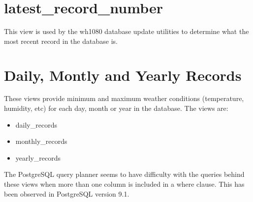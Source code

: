 \documentclass[a4paper,10pt]{book}
\begin{document}
\section{latest\_record\_number}
This view is used by the wh1080 database update utilities to determine what the most recent record in the database is.

\section{Daily, Montly and Yearly Records}
These views provide minimum and maximum weather conditions (temperature, humidity, etc) for each day, month or year in the database. The views are:
\begin{itemize}
\item daily\_records
\item monthly\_records
\item yearly\_records
\end{itemize}

The PostgreSQL query planner seems to have difficulty with the queries behind these views when more than one column is included in a where clause. This has been observed in PostgreSQL version 9.1.
\end{document}
